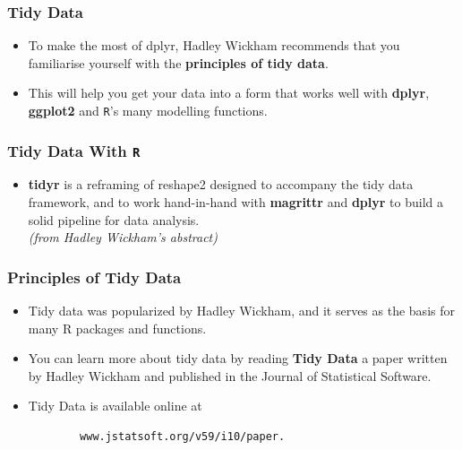 \documentclass[TIDYMASTER.tex]{subfiles}
\begin{document}
	\begin{frame}
		\frametitle{Tidy Data}
		\Large
		\vspace{-1.5cm}
		\begin{itemize}
			
			\item To make the most of dplyr, Hadley Wickham recommends that you familiarise yourself with the \textbf{principles of tidy data}. 
			\item This will help you get your data into a form that works well with \textbf{dplyr}, \textbf{ggplot2} and \texttt{R}'s many modelling functions.
		\end{itemize}
	\end{frame}
\begin{frame}
	\frametitle{Tidy Data With \texttt{R}}
	\Large
	\vspace{-1cm}
	\begin{itemize}
		\item \textbf{tidyr} is a reframing of reshape2 designed to accompany the tidy data framework, and to work hand-in-hand with \textbf{magrittr} and \textbf{dplyr} to build a solid pipeline for data analysis. \\ \textit{(from Hadley Wickham's abstract)}
	\end{itemize}
	
	
\end{frame}
\begin{frame}[fragile]
	\frametitle{Principles of Tidy Data}
	\Large
	\begin{itemize}
		\item 	Tidy data was popularized by Hadley Wickham, and it serves as the basis for many R packages and functions. 
		\item You can learn more about tidy data by reading \textbf{Tidy Data} a paper written by Hadley Wickham and published in the Journal of Statistical Software. 
		\item Tidy Data is available online at \begin{verbatim}
		www.jstatsoft.org/v59/i10/paper.
		\end{verbatim}
	\end{itemize}
\end{frame}	
\end{document}

